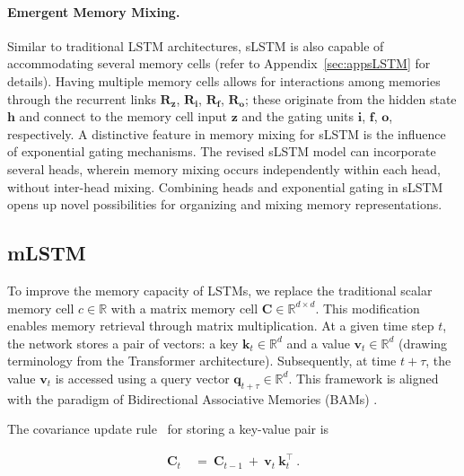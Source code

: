 \paragraph{Emergent Memory Mixing.} Similar to traditional LSTM architectures, sLSTM is also capable of accommodating several memory cells (refer to Appendix~\ref{sec:appsLSTM} for details). Having multiple memory cells allows for interactions among memories through the recurrent links $\mathbf{R}_{\mathbf{z}}$, $\mathbf{R}_{\mathbf{i}}$, $\mathbf{R}_{\mathbf{f}}$, $\mathbf{R}_{\mathbf{o}}$; these originate from the hidden state $\mathbf{h}$ and connect to the memory cell input $\mathbf{z}$ and the gating units $\mathbf{i}$, $\mathbf{f}$, $\mathbf{o}$, respectively. A distinctive feature in memory mixing for sLSTM is the influence of exponential gating mechanisms. The revised sLSTM model can incorporate several heads, wherein memory mixing occurs independently within each head, without inter-head mixing. Combining heads and exponential gating in sLSTM opens up novel possibilities for organizing and mixing memory representations.

\subsection{mLSTM}
\label{sec:mLSTM}

To improve the memory capacity of LSTMs, we replace the traditional scalar memory cell $c \in \mathbb{R}$ with a matrix memory cell $\mathbf{C} \in \mathbb{R}^{d \times d}$. This modification enables memory retrieval through matrix multiplication. At a given time step $t$, the network stores a pair of vectors: a key $\mathbf{k}_t \in \mathbb{R}^d$ and a value $\mathbf{v}_t \in \mathbb{R}^d$ (drawing terminology from the Transformer architecture). Subsequently, at time $t + \tau$, the value $\mathbf{v}_t$ is accessed using a query vector $\mathbf{q}_{t+\tau} \in \mathbb{R}^d$. This framework is aligned with the paradigm of Bidirectional Associative Memories (BAMs) \citep{Kohonen:72,Anderson:72,Nakano:72,Anderson:77}.

The covariance update rule~\citep{Sejnowski:77,Dayan:91} for storing a key-value pair is

\begin{align}
\mathbf{C}_t \ &= \ \mathbf{C}_{t-1} \ + \ \mathbf{v}_{t} \ \mathbf{k}_t^\top \ .
\end{align}

